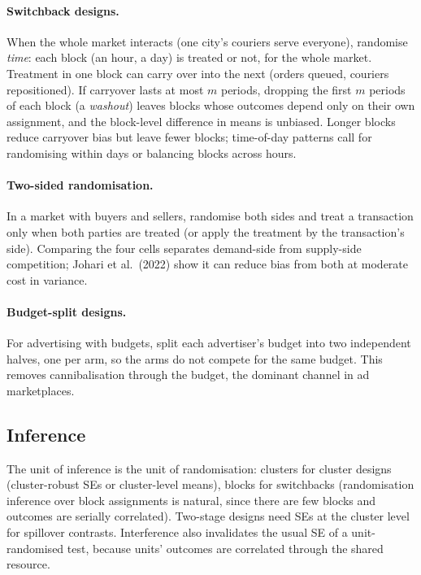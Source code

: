 \documentclass[11pt]{article}
\begin{document}
\paragraph{Switchback designs.} When the whole market interacts (one city's couriers serve everyone), randomise
\emph{time}: each block (an hour, a day) is treated or not, for the whole market. Treatment in one block can carry over
into the next (orders queued, couriers repositioned). If carryover lasts at most $m$ periods, dropping the first $m$
periods of each block (a \emph{washout}) leaves blocks whose outcomes depend only on their own assignment, and the
block-level difference in means is unbiased. Longer blocks reduce carryover bias but leave fewer blocks; time-of-day
patterns call for randomising within days or balancing blocks across hours.

\paragraph{Two-sided randomisation.} In a market with buyers and sellers, randomise both sides and treat a transaction
only when both parties are treated (or apply the treatment by the transaction's side). Comparing the four cells
separates demand-side from supply-side competition; Johari et al.\ (2022) show it can reduce bias from both at
moderate cost in variance.

\paragraph{Budget-split designs.} For advertising with budgets, split each advertiser's budget into two independent
halves, one per arm, so the arms do not compete for the same budget. This removes cannibalisation through the
budget, the dominant channel in ad marketplaces.

\subsection{Inference}

The unit of inference is the unit of randomisation: clusters for cluster designs (cluster-robust SEs or cluster-level
means), blocks for switchbacks (randomisation inference over block assignments is natural, since there are few blocks
and outcomes are serially correlated). Two-stage designs need SEs at the cluster level for spillover contrasts.
Interference also invalidates the usual SE of a unit-randomised test, because units' outcomes are correlated through
the shared resource.
\end{document}
